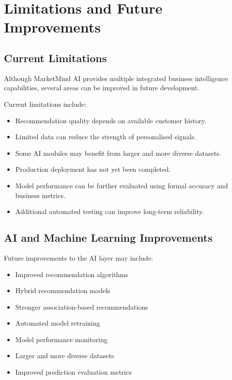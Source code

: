 \documentclass[12pt,a4paper]{report}
\begin{document}
\newpage



\chapter{Limitations and Future Improvements}

\section{Current Limitations}

Although MarketMind AI provides multiple integrated business
intelligence capabilities, several areas can be improved in future
development.

Current limitations include:

\begin{itemize}
    \item Recommendation quality depends on available customer history.
    \item Limited data can reduce the strength of personalised signals.
    \item Some AI modules may benefit from larger and more diverse
    datasets.
    \item Production deployment has not yet been completed.
    \item Model performance can be further evaluated using formal
    accuracy and business metrics.
    \item Additional automated testing can improve long-term
    reliability.
\end{itemize}



\section{AI and Machine Learning Improvements}

Future improvements to the AI layer may include:

\begin{itemize}
    \item Improved recommendation algorithms
    \item Hybrid recommendation models
    \item Stronger association-based recommendations
    \item Automated model retraining
    \item Model performance monitoring
    \item Larger and more diverse datasets
    \item Improved prediction evaluation metrics
\end{itemize}
\end{document}
